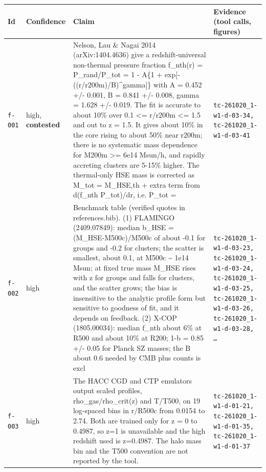\documentclass[11pt,a4paper]{article}
\begin{document}
\begin{longtable}{@{}p{}p{}p{}p{}@{}}
\toprule Id & Confidence & Claim & Evidence (tool calls, figures) \\ \midrule \endhead
\texttt{f-001} & high, \textbf{contested} & Nelson, Lau \& Nagai 2014 (arXiv:1404.4636) give a redshift-universal non-thermal pressure fraction f\_nth(r) = P\_rand/P\_tot = 1 - A\{1 + exp[-((r/r200m)/B)\textasciicircum{}gamma]\} with A = 0.452 +/- 0.001, B = 0.841 +/- 0.008, gamma = 1.628 +/- 0.019. The fit is accurate to about 10\% over 0.1 \textless{}= r/r200m \textless{}= 1.5 and out to z = 1.5. It gives about 10\% in the core rising to about 50\% near r200m; there is no systematic mass dependence for M200m \textgreater{}= 6e14 Msun/h, and rapidly accreting clusters are 5-15\% higher. The thermal-only HSE mass is corrected as M\_tot = M\_HSE,th + extra term from d(f\_nth P\_tot)/dr, i.e. P\_tot =  & \texttt{tc-261020\_\allowbreak{}1-w1-d-03-34,\allowbreak{} tc-261020\_\allowbreak{}1-w1-d-03-41} \\
\texttt{f-002} & high & Benchmark table (verified quotes in references.bib). (1) FLAMINGO (2409.07849): median b\_HSE = (M\_HSE-M500c)/M500c of about -0.1 for groups and -0.2 for clusters; the scatter is smallest, about 0.1, at M500c \textasciitilde{} 1e14 Msun; at fixed true mass M\_HSE rises with z for groups and falls for clusters, and the scatter grows; the bias is insensitive to the analytic profile form but sensitive to goodness of fit, and it depends on feedback. (2) X-COP (1805.00034): median f\_nth about 6\% at R500 and about 10\% at R200; 1-b = 0.85 +/- 0.05 for Planck SZ masses; the B about 0.6 needed by CMB plus counts is excl & \texttt{tc-261020\_\allowbreak{}1-w1-d-03-23,\allowbreak{} tc-261020\_\allowbreak{}1-w1-d-03-24,\allowbreak{} tc-261020\_\allowbreak{}1-w1-d-03-25,\allowbreak{} tc-261020\_\allowbreak{}1-w1-d-03-26,\allowbreak{} tc-261020\_\allowbreak{}1-w1-d-03-28,\allowbreak{} \ldots{}\allowbreak{}} \\
\texttt{f-003} & high & The HACC CGD and CTP emulators output scaled profiles, rho\_gas/rho\_crit(z) and T/T500, on 19 log-spaced bins in r/R500c from 0.0154 to 2.74. Both are trained only for z = 0 to 0.4987, so z=1 is unavailable and the high redshift used is z=0.4987. The halo mass bin and the T500 convention are not reported by the tool. & \texttt{tc-261020\_\allowbreak{}1-w1-d-01-21,\allowbreak{} tc-261020\_\allowbreak{}1-w1-d-01-35,\allowbreak{} tc-261020\_\allowbreak{}1-w1-d-01-37} \\

\end{longtable}
\end{document}
